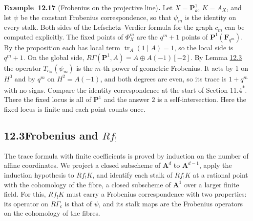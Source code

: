 \documentclass[11pt]{article}
\newenvironment{bpstatement}[2]{\par\addvspace{0.6\baselineskip}\noindent\textbf{#1}#2\textbf{.}\enspace\ignorespaces}
  {\par\addvspace{0.4\baselineskip}}
\newcommand{\bpout}[1]{#1\textsuperscript{\hyperlink{bp-outside}{\ensuremath{\ast}}}}
\begin{document}
\label{bp52}%
\begin{bpstatement}{Example~12.17}{ (Frobenius on the projective line)}
Let \(X=\mathbf P^1_k\), \(K=A_X\), and let \(\psi\) be the constant Frobenius correspondence, so that \(\psi_m\) is the identity on every stalk. Both sides of the Lefschetz–Verdier formula for the graph \(c_m\) can be computed explicitly. The fixed points of \(\Phi_X^m\) are the \(q^m+1\) points of \(\mathbf P^1(\mathbf F_{q^m})\). By the proposition each has local term \(\operatorname{tr}_A(1\mid A)=1\), so the local side is \(q^m+1\). On the global side, \(R\Gamma(\mathbf P^1,A)=A\oplus A(-1)[-2]\). By Lemma \hyperref[bp9]{12.3} the operator \(T_{c_m}(\psi_m)\) is the \(m\)-th power of geometric Frobenius. It acts by \(1\) on \(H^0\) and by \(q^m\) on \(H^2=A(-1)\), and both degrees are even, so its trace is \(1+q^m\) with no signs. Compare the identity correspondence at the start of Section \bpout{11.4}. There the fixed locus is all of \(\mathbf P^1\) and the answer \(2\) is a self-intersection. Here the fixed locus is finite and each point counts once.
\end{bpstatement}



\subsection*{\texorpdfstring{12.3\quad Frobenius and $Rf_!$}{12.3 Frobenius and Rf!}}
\label{bp53}%
\label{bp54}%
The trace formula with finite coefficients is proved by induction on the number of affine coordinates. We project a closed subscheme of \(\mathbf A^d\) to \(\mathbf A^{d-1}\), apply the induction hypothesis to \(Rf_!K\), and identify each stalk of \(Rf_!K\) at a rational point with the cohomology of the fibre, a closed subscheme of \(\mathbf A^1\) over a larger finite field. For this, \(Rf_!K\) must carry a Frobenius correspondence with two properties: its operator on \(R\Gamma_c\) is that of \(\psi\), and its stalk maps are the Frobenius operators on the cohomology of the fibres.
\end{document}
